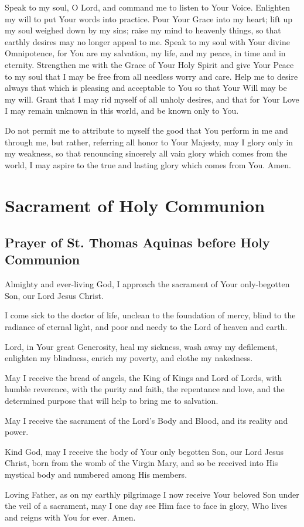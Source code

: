 \documentclass[12pt]{article}
\newcommand{\prayersection}[1]{\section{#1}}
\newcommand{\prayertitle}[1]{\subsection{#1}}
\begin{document}
Speak to my soul, O Lord, and command me to listen to Your Voice.
Enlighten my will to put Your words into practice.
Pour Your Grace into my heart;
lift up my soul weighed down by my sins;
raise my mind to heavenly things, so that earthly desires may no longer appeal to me.
Speak to my soul with Your divine Omnipotence, for You are my salvation, my life, and my peace, in time and in eternity.
Strengthen me with the Grace of Your Holy Spirit and give Your Peace to my soul that I may be free from all needless worry and care.
Help me to desire always that which is pleasing and acceptable to You so that Your Will may be my will.
Grant that I may rid myself of all unholy desires, and that for Your Love I may remain unknown in this world, and be known only to You.

Do not permit me to attribute to myself the good that You perform in me and through me, but rather, referring all honor to Your Majesty, may I glory only in my weakness, so that renouncing sincerely all vain glory which comes from the world, I may aspire to the true and lasting glory which comes from You. Amen.

\newpage

\prayersection{Sacrament of Holy Communion}
\prayertitle{Prayer of St. Thomas Aquinas before Holy Communion}
Almighty and ever-living God, I approach the sacrament of Your only-begotten Son, our Lord Jesus Christ.

I come sick to the doctor of life, unclean to the foundation of mercy, blind to the radiance of eternal light, and poor and needy to the Lord of heaven and earth.

Lord, in Your great Generosity, heal my sickness, wash away my defilement, enlighten my blindness, enrich my poverty, and clothe my nakedness.

May I receive the bread of angels, the King of Kings and Lord of Lords, with humble reverence, with the purity and faith, the repentance and love, and the determined purpose that will help to bring me to salvation.

May I receive the sacrament of the Lord's Body and Blood, and its reality and power.

Kind God, may I receive the body of Your only begotten Son, our Lord Jesus Christ, born from the womb of the Virgin Mary, and so be received into His mystical body and numbered among His members.

Loving Father, as on my earthly pilgrimage I now receive Your beloved Son under the veil of a sacrament, may I one day see Him face to face in glory, Who lives and reigns with You for ever.
Amen.
\end{document}
